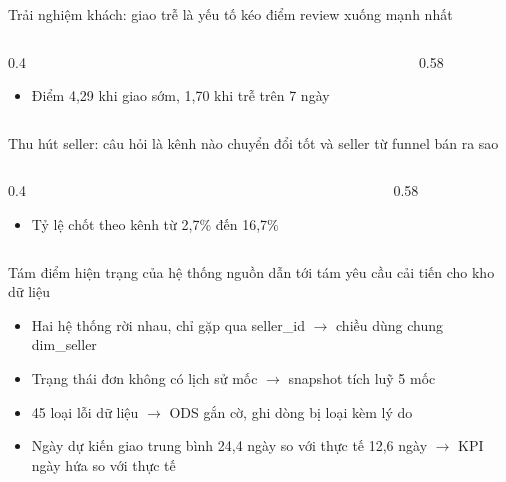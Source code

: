 \begin{frame}{Trải nghiệm khách: giao trễ là yếu tố kéo điểm review xuống mạnh nhất}
\begin{columns}[T]\begin{column}{0.4\textwidth}
\begin{itemize}
  \item Điểm 4,29 khi giao sớm, 1,70 khi trễ trên 7 ngày
\end{itemize}
\end{column}\begin{column}{0.58\textwidth}
\begin{center}\end{center}
\end{column}\end{columns}

\end{frame}

\begin{frame}{Thu hút seller: câu hỏi là kênh nào chuyển đổi tốt và seller từ funnel bán ra sao}
\begin{columns}[T]\begin{column}{0.4\textwidth}
\begin{itemize}
  \item Tỷ lệ chốt theo kênh từ 2,7\% đến 16,7\%
\end{itemize}
\end{column}\begin{column}{0.58\textwidth}
\begin{center}\end{center}
\end{column}\end{columns}

\end{frame}

\begin{frame}{Tám điểm hiện trạng của hệ thống nguồn dẫn tới tám yêu cầu cải tiến cho kho dữ liệu}
\begin{itemize}
  \item Hai hệ thống rời nhau, chỉ gặp qua seller\_id $\rightarrow$ chiều dùng chung dim\_seller
  \item Trạng thái đơn không có lịch sử mốc $\rightarrow$ snapshot tích luỹ 5 mốc
  \item 45 loại lỗi dữ liệu $\rightarrow$ ODS gắn cờ, ghi dòng bị loại kèm lý do
  \item Ngày dự kiến giao trung bình 24,4 ngày so với thực tế 12,6 ngày $\rightarrow$ KPI ngày hứa so với thực tế
\end{itemize}

\end{frame}

